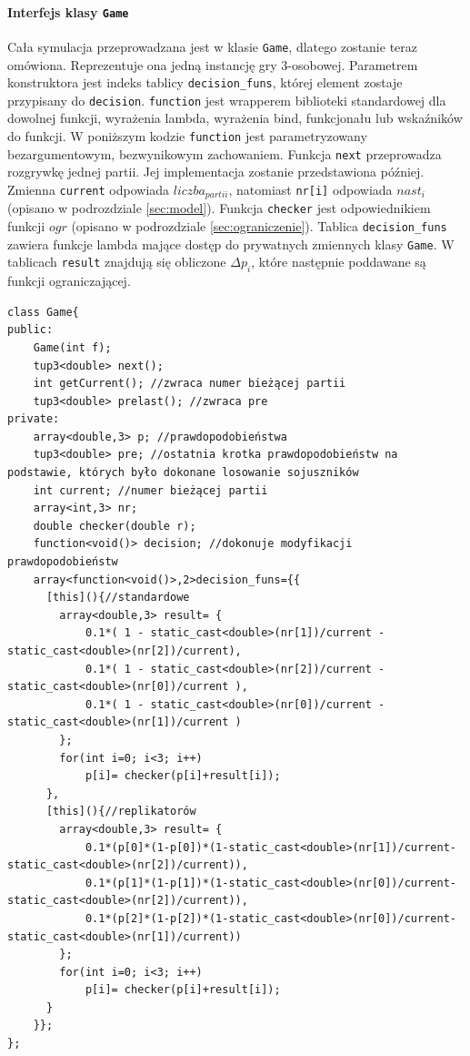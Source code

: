 \paragraph{Interfejs klasy \texttt{Game}}
Cała symulacja przeprowadzana jest w klasie \texttt{Game}, dlatego zostanie teraz omówiona. Reprezentuje ona jedną instancję gry 3-osobowej. Parametrem konstruktora jest indeks tablicy \texttt{decision\_funs}, której element zostaje przypisany do \texttt{decision}. \texttt{function} jest wrapperem biblioteki standardowej dla dowolnej funkcji, wyrażenia lambda, wyrażenia bind, funkcjonału lub wskaźników do funkcji. W poniższym kodzie \texttt{function} jest parametryzowany bezargumentowym, bezwynikowym zachowaniem. Funkcja \texttt{next} przeprowadza rozgrywkę jednej partii. Jej implementacja zostanie przedstawiona później. Zmienna \texttt{current} odpowiada $liczba_{partii}$, natomiast \texttt{nr[i]} odpowiada $nast_i$ (opisano w podrozdziale \ref{sec:model}). Funkcja \texttt{checker} jest odpowiednikiem funkcji $ogr$ (opisano w podrozdziale \ref{sec:ograniczenie}). Tablica \texttt{decision\_funs} zawiera funkcje lambda mające dostęp do prywatnych zmiennych klasy \texttt{Game}. W tablicach \texttt{result} znajdują się obliczone $\Delta p_i$, które następnie poddawane są funkcji ograniczającej. 

\begin{lstlisting}
class Game{
public:
    Game(int f);
    tup3<double> next();
    int getCurrent(); //zwraca numer bieżącej partii
    tup3<double> prelast(); //zwraca pre
private:
    array<double,3> p; //prawdopodobieństwa
    tup3<double> pre; //ostatnia krotka prawdopodobieństw na podstawie, których było dokonane losowanie sojuszników
    int current; //numer bieżącej partii
    array<int,3> nr;
    double checker(double r);
    function<void()> decision; //dokonuje modyfikacji prawdopodobieństw
    array<function<void()>,2>decision_funs={{
      [this](){//standardowe
        array<double,3> result= {
            0.1*( 1 - static_cast<double>(nr[1])/current - static_cast<double>(nr[2])/current),
            0.1*( 1 - static_cast<double>(nr[2])/current - static_cast<double>(nr[0])/current ),
            0.1*( 1 - static_cast<double>(nr[0])/current - static_cast<double>(nr[1])/current )
        };
        for(int i=0; i<3; i++)
            p[i]= checker(p[i]+result[i]);
      },
      [this](){//replikatorów
        array<double,3> result= {
            0.1*(p[0]*(1-p[0])*(1-static_cast<double>(nr[1])/current-static_cast<double>(nr[2])/current)),
            0.1*(p[1]*(1-p[1])*(1-static_cast<double>(nr[0])/current-static_cast<double>(nr[2])/current)),
            0.1*(p[2]*(1-p[2])*(1-static_cast<double>(nr[0])/current-static_cast<double>(nr[1])/current))
        };
        for(int i=0; i<3; i++)
            p[i]= checker(p[i]+result[i]);
      }
    }};
};
\end{lstlisting}

